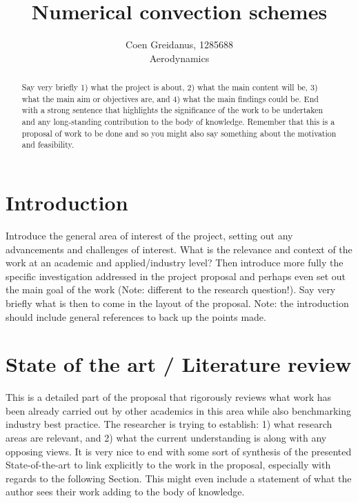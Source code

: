 \documentclass{article}
\title{Numerical convection schemes}
\author{Coen Greidanus, 1285688\\
Aerodynamics}
\begin{document}
\maketitle

\begin{abstract}

Say very briefly 1) what the project is about, 2) what the main content will be, 3) what the main aim or objectives are, and 4) what the main findings could be. End with a strong sentence that highlights the significance of the work to be undertaken and any long-standing contribution to the body of knowledge. Remember that this is a proposal of work to be done and so you might also say something about the motivation and feasibility.

\end{abstract}

\section{Introduction}
\label{sec:intro}

Introduce the general area of interest of the project, setting out any advancements and challenges of interest. What is the relevance and context of the work at an academic and applied/industry level? Then introduce more fully the specific investigation addressed in the project proposal and perhaps even set out the main goal of the work (Note: different to the research question!). Say very briefly what is then to come in the layout of the proposal. Note: the introduction should include general references to back up the points made.

\section{State of the art / Literature review}
\label{sec:litreview}

This is a detailed part of the proposal that rigorously reviews what work has been already carried out by other academics in this area while also benchmarking industry best practice. The researcher is trying to establish: 1) what research areas are relevant, and 2) what the current understanding is along with any opposing views. It is very nice to end with some sort of synthesis of the presented State-of-the-art to link explicitly to the work in the proposal, especially with regards to the following Section. This might even include a statement of what the author sees their work adding to the body of knowledge.
\end{document}
